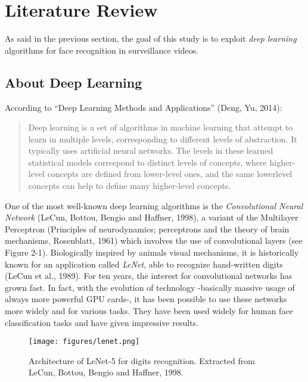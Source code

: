\setlength{\footskip}{8mm}

\chapter{Literature Review} 
\protect\label{ch:literature-review}

As said in the previous section, the goal of this study is to exploit \textit{deep learning} algorithms for face recognition in surveillance videos.

\section{About Deep Learning}
\protect\label{Main-keywords-of-the-topic}
According to \enquote{Deep Learning Methods and Applications} (Deng, Yu, 2014):

\blockquote{Deep learning is a set of algorithms in machine
learning that attempt to learn in multiple levels, corresponding
to different levels of abstraction. It typically uses artificial
neural networks. The levels in these learned statistical models
correspond to distinct levels of concepts, where higher-level concepts
are defined from lower-level ones, and the same lowerlevel
concepts can help to define many higher-level concepts.}

One of the most well-known deep learning algorithms is the \textit{Convolutional Neural Network} (LeCun, Bottou, Bengio and Haffner, 1998), a variant of the Multilayer Perceptron (Principles of neurodynamics; perceptrons and the theory of brain mechanisms, Rosenblatt, 1961) which involves the use of convolutional layers (see Figure 2-1). Biologically inspired by animals visual mechanisms, it is historically known for an application called \textit{LeNet}, able to recognize hand-written digits (LeCun et al., 1989). For ten years, the interest for convolutional networks has grown fast. In fact, with the evolution of technology -basically massive usage of always more powerful GPU cards-, it has been possible to use these networks more widely and for various tasks. They have been used widely for human face classification tasks and have given impressive results.

\begin{figure}[!ht]
  \centering
  \texttt{[image: figures/lenet.png]}  
  \caption[Architecture of LeNet-5 for digits recognition. Extracted from LeCun, Bottou, Bengio and Haffner, 1998.]{Architecture of LeNet-5 for digits recognition. Extracted from LeCun, Bottou, Bengio and Haffner, 1998.}
  \protect\label{fig:lenet}
\end{figure}

